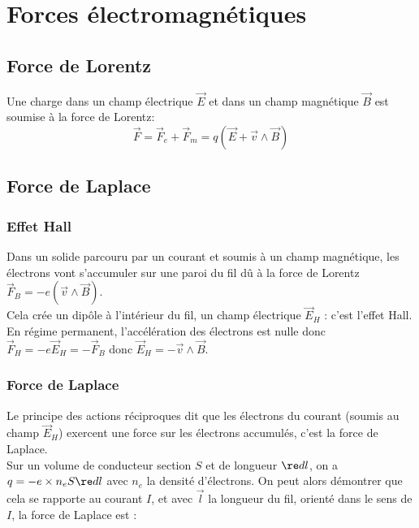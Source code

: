 \documentclass[13pt, twoside, a4paper, french]{report}
\begin{document}
\chapter{Forces électromagnétiques}


    \section{Force de Lorentz}

        Une charge dans un champ électrique $\vec E$ et dans un champ magnétique $\vec B$ est soumise à la force de Lorentz:\\

        \[\vec F = \vec F_e + \vec F_m = q (\vec E + \vec v \wedge \vec B)\]


    \section{Force de Laplace}

        \subsection{Effet Hall}

            Dans un solide parcouru par un courant et soumis à un champ magnétique, les électrons vont s'accumuler sur une paroi du fil dû à la force de Lorentz $\vec F_B = -e (\vec v \wedge \vec B)$.\\

            Cela crée un dipôle à l'intérieur du fil, un champ électrique $\vec E_H$ : c'est l'effet Hall.\\
            En régime permanent, l'accélération des électrons est nulle donc $\vec F_H = -e \vec E_H = - \vec F_B$ donc $\vec E_H = - \vec v \wedge \vec B$.\\

        \subsection{Force de Laplace}

            Le principe des actions réciproques dit que les électrons du courant (soumis au champ $\vec E_H$) exercent une force sur les électrons accumulés, c'est la force de Laplace.\\

            Sur un volume de conducteur section $S$ et de longueur $\re d l$, on a $q = -e \times n_e S \re d l$ avec $n_e$ la densité d'électrons. On peut alors démontrer que cela se rapporte au courant $I$, et avec $\vec l$ la longueur du fil, orienté dans le sens de $I$, la force de Laplace est :
\end{document}
